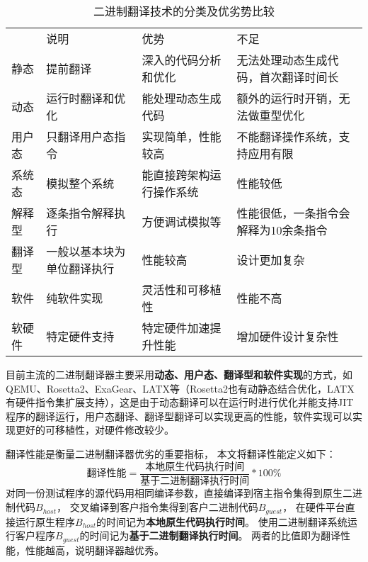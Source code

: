 \begin{table}[!htbp]
  \caption{二进制翻译技术的分类及优劣势比较}
  \label{tab:BTs}
  \begin{adjustbox}{width=\textwidth}
  \begin{tabular}{llll}
  \rowcolor[HTML]{FFCE93} 
      & 说明                  & 优势           & 不足                  \\
  静态  & 提前翻译                & 深入的代码分析和优化   & 无法处理动态生成代码，首次翻译时间长  \\
  动态  & 运行时翻译和优化            & 能处理动态生成代码    & 额外的运行时开销，无法做重型优化    \\
  \hline
  用户态 & 只翻译用户态指令            & 实现简单，性能较高    & 不能翻译操作系统，支持应用有限     \\
  系统态 &  模拟整个系统 & 能直接跨架构运行操作系统 & 性能较低                \\
  \hline
  解释型 & 逐条指令解释执行            & 方便调试模拟等      & 性能很低，一条指令会解释为10余条指令 \\
  翻译型 & 一般以基本块为单位翻译执行       & 性能较高         & 设计更加复杂              \\
  \hline
  软件  & 纯软件实现               & 灵活性和可移植性     & 性能不高                \\
  软硬件 & 特定硬件支持    & 特定硬件加速提升性能   & 增加硬件设计复杂性          
  \end{tabular}
  \end{adjustbox}
  \end{table}

目前主流的二进制翻译器主要采用\textbf{动态、用户态、翻译型和软件实现}的方式，如QEMU\cite{bellardQEMUFastPortable2005}、Rosetta2\cite{RosettaTranslationEnvironment, RunningIntelBinaries}、ExaGear\cite{KunPengExaGear}、LATX\cite{LoongArchEnv2022, LoongArch2023}等（Rosetta2也有动静态结合优化，LATX有硬件指令集扩展支持），这是由于动态翻译可以在运行时进行优化并能支持JIT程序的翻译运行，用户态翻译、翻译型翻译可以实现更高的性能，软件实现可以实现更好的可移植性，对硬件修改较少。



翻译性能是衡量二进制翻译器优劣的重要指标，
本文将翻译性能定义如下：
\begin{equation}\label{eq:bt_performance}
    \text{翻译性能} = \frac{\text{本地原生代码执行时间}}{\text{基于二进制翻译执行时间}} * 100\%
\end{equation}
对同一份测试程序的源代码用相同编译参数，直接编译到宿主指令集得到原生二进制代码$B_{host}$，
交叉编译到客户指令集得到客户二进制代码$B_{guest}$，
在硬件平台直接运行原生程序$B_{host}$的时间记为\textbf{本地原生代码执行时间}。
使用二进制翻译系统运行客户程序$B_{guest}$的时间记为\textbf{基于二进制翻译执行时间}。
两者的比值即为翻译性能，性能越高，说明翻译器越优秀。


